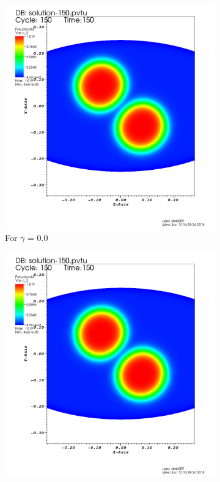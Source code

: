 \documentclass[idxtotoc,hyperref,openany]{labbook} %
\begin{document}
\begin{figure}[h!]
	\centering
	\begin{subfigure}[h!]{0.4\textwidth}
		\includegraphics[width=\textwidth]{0.png}
		\caption{For $\gamma$ = 0.0}
		\label{fig:0.png}
	\end{subfigure}
	\begin{subfigure}[h!]{0.4\textwidth}
		\includegraphics[width=\textwidth]{1e_05.png}

\end{subfigure}
\end{figure}
\end{document}
